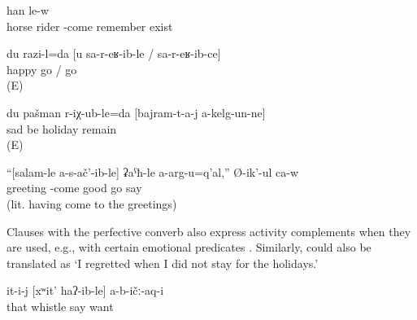 \begin{exe}
	\ex	\label{ex:‎I remember that he came riding on a horse}
		han	le-w\\
			horse	rider	-come	remember	exist\\
	\glt	{}

	\ex	\label{ex:‎‎‎I am happy that you came preterite converb}
	\gll	du	razi-l=da	[u	sa-r-eʁ-ib-le	/	sa-r-eʁ-ib-ce]\\
			happy		go	/ go\\
	\glt	{} (E)

	\ex	\label{ex:‎‎‎I regret that I did not stay for the holidays}
	\gll	du	pašman	r-iχ-ub-le=da	[bajram-t-a-j	a-kelg-un-ne]\\
			sad	be	holiday	remain\\
	\glt	{} (E)


	\ex	\label{ex:‎‎‎He said that it is not good that he did not go to the meeting}
	\gll	``[salam-le	a-s-ač'-ib-le]	ʡaˁħ-le	a-arg-u=q'al,''	Ø-ik'-ul	ca-w\\
		greeting	-come	good	go	say	\\
	\glt	{} (lit. having come to the greetings)
	
\end{exe}

Clauses with the perfective converb also express activity complements when they are used, e.g., with certain emotional predicates . Similarly,  could also be translated as `I regretted when I did not stay for the holidays.' 

%
\begin{exe}
	\ex	\label{ex:He did not like when one whistled}
	\gll	it-i-j	[xʷit'	haʔ-ib-le]	a-b-ičː-aq-i\\
		that	whistle	say	want\\
	\glt	{}
\end{exe}

